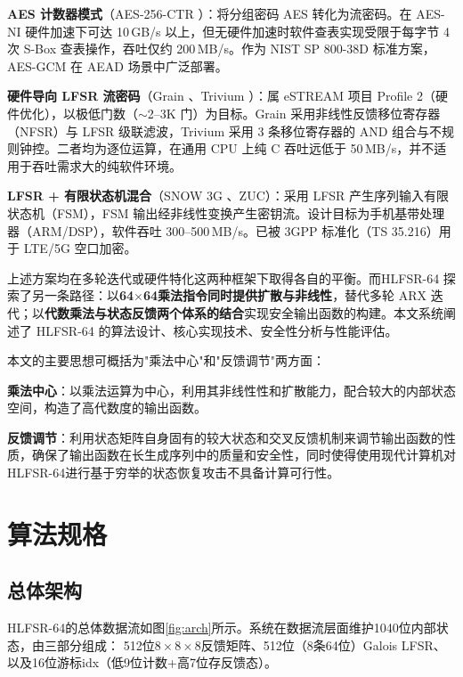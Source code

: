 \documentclass[11pt,a4paper]{ctexart}
\begin{document}
\textbf{AES 计数器模式}（AES-256-CTR \cite{gcm}）：将分组密码 AES 转化为流密码。在 AES-NI 硬件加速下可达 10\,GB/s 以上，但无硬件加速时软件查表实现受限于每字节 4 次 S-Box 查表操作，吞吐仅约 200\,MB/s。作为 NIST SP 800-38D 标准方案，AES-GCM 在 AEAD 场景中广泛部署。

\textbf{硬件导向 LFSR 流密码}（Grain \cite{grain}、Trivium \cite{trivium}）：属 eSTREAM 项目 Profile 2（硬件优化），以极低门数（$\sim$2--3K 门）为目标。Grain 采用非线性反馈移位寄存器（NFSR）与 LFSR 级联滤波，Trivium 采用 3 条移位寄存器的 AND 组合与不规则钟控。二者均为逐位运算，在通用 CPU 上纯 C 吞吐远低于 50\,MB/s，并不适用于吞吐需求大的纯软件环境。

\textbf{LFSR + 有限状态机混合}（SNOW 3G \cite{etsi-snow}、ZUC）：采用 LFSR 产生序列输入有限状态机（FSM），FSM 输出经非线性变换产生密钥流。设计目标为手机基带处理器（ARM/DSP），软件吞吐 300--500\,MB/s。已被 3GPP 标准化（TS 35.216）用于 LTE/5G 空口加密。

上述方案均在多轮迭代或硬件特化这两种框架下取得各自的平衡。而HLFSR-64 探索了另一条路径：以\textbf{64$\times$64乘法指令同时提供扩散与非线性}，替代多轮 ARX 迭代；以\textbf{代数乘法与状态反馈两个体系的结合}实现安全输出函数的构建。本文系统阐述了 HLFSR-64 的算法设计、核心实现技术、安全性分析与性能评估。

本文的主要思想可概括为"乘法中心"和"反馈调节"两方面：

\textbf{乘法中心}：以乘法运算为中心，利用其非线性性和扩散能力，配合较大的内部状态空间，构造了高代数度的输出函数。

\textbf{反馈调节}：利用状态矩阵自身固有的较大状态和交叉反馈机制来调节输出函数的性质，确保了输出函数在长生成序列中的质量和安全性，同时使得使用现代计算机对HLFSR-64进行基于穷举的状态恢复攻击不具备计算可行性。

\section{算法规格}

\subsection{总体架构}

HLFSR-64的总体数据流如图\ref{fig:arch}所示。系统在数据流层面维护1040位内部状态，由三部分组成：
512位$8\times8\times8$反馈矩阵、512位（8条64位）Galois LFSR、以及16位游标idx（低9位计数+高7位存反馈态）。
\end{document}
